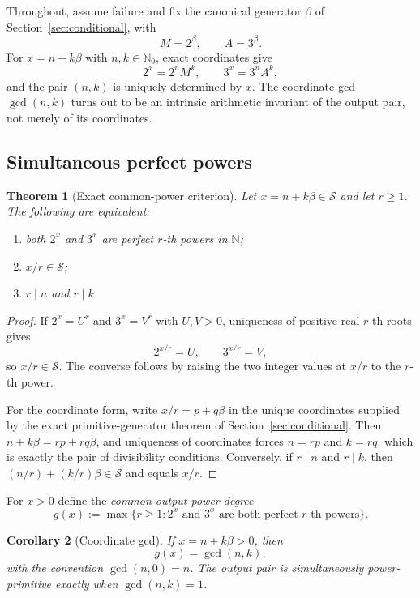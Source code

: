 \documentclass[11pt,oneside]{article}
\newtheorem{theorem}{Theorem}[section]
\newtheorem{corollary}[theorem]{Corollary}
\theoremstyle{definition}
\theoremstyle{remark}
\newcommand{\N}{\mathbb N}
\newcommand{\Nzero}{\mathbb N_0}
\newcommand{\Sol}{\mathcal S}
\begin{document}
Throughout, assume failure and fix the canonical generator $\beta$ of
Section~\ref{sec:conditional}, with
\[
 M=2^{\beta},\qquad A=3^{\beta}.
\]
For $x=n+k\beta$ with $n,k\in\Nzero$, exact coordinates give
\begin{equation}
 2^x=2^nM^k,
 \qquad
 3^x=3^nA^k,
\label{pp:eq-output-coordinates}
\end{equation}
and the pair $(n,k)$ is uniquely determined by $x$.  The coordinate gcd $\gcd(n,k)$ turns out
to be an intrinsic arithmetic invariant of the output pair, not merely of its coordinates.

\subsection{Simultaneous perfect powers}

\begin{theorem}[Exact common-power criterion]
\label{pp:common-power}
Let $x=n+k\beta\in\Sol$ and let $r\ge1$.  The following are equivalent:
\begin{enumerate}[label=\textup{(\roman*)}]
\item both $2^x$ and $3^x$ are perfect $r$-th powers in $\N$;
\item $x/r\in\Sol$;
\item $r\mid n$ and $r\mid k$.
\end{enumerate}
\end{theorem}

\begin{proof}
If $2^x=U^r$ and $3^x=V^r$ with $U,V>0$, uniqueness of positive real $r$-th roots gives
\[
 2^{x/r}=U,\qquad 3^{x/r}=V,
\]
so $x/r\in\Sol$.  The converse follows by raising the two integer values at $x/r$ to the
$r$-th power.

For the coordinate form, write $x/r=p+q\beta$ in the unique coordinates supplied by the exact
primitive-generator theorem of Section~\ref{sec:conditional}.  Then $n+k\beta=rp+rq\beta$, and
uniqueness of coordinates forces $n=rp$ and $k=rq$, which is exactly the pair of divisibility
conditions.  Conversely, if $r\mid n$ and $r\mid k$, then $(n/r)+(k/r)\beta\in\Sol$ and equals
$x/r$.
\end{proof}

For $x>0$ define the \emph{common output power degree}
\[
 g(x):=\max\{r\ge1:\text{$2^x$ and $3^x$ are both perfect $r$-th powers}\}.
\]

\begin{corollary}[Coordinate gcd]
\label{pp:gcd-degree}
If $x=n+k\beta>0$, then
\[
 g(x)=\gcd(n,k),
\]
with the convention $\gcd(n,0)=n$.  The output pair is simultaneously power-primitive exactly
when $\gcd(n,k)=1$.
\end{corollary}
\end{document}
